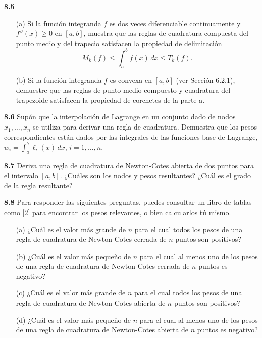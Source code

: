 \documentclass{article}
\begin{document}
\textbf{8.5}
\begin{itemize}
    \item[(a)] Si la función integranda \(f\) es dos veces diferenciable continuamente y \(f''(x) \geq 0\) en \([a, b]\), muestra que las reglas de cuadratura compuesta del punto medio y del trapecio satisfacen la propiedad de delimitación
    \[
    M_k(f) \leq \int_a^b f(x) \, dx \leq T_k(f).
    \]
    \item[(b)] Si la función integranda \(f\) es convexa en \([a, b]\) (ver Sección 6.2.1), demuestre que las reglas de punto medio compuesto y cuadratura del trapezoide satisfacen la propiedad de corchetes de la parte a.
\end{itemize}

\textbf{8.6} Supón que la interpolación de Lagrange en un conjunto dado de nodos \(x_1, \dots, x_n\) se utiliza para derivar una regla de cuadratura. Demuestra que los pesos correspondientes están dados por las integrales de las funciones base de Lagrange, \(w_i = \int_a^b \ell_i(x) \, dx\), \(i = 1, \dots, n\).

\textbf{8.7} Deriva una regla de cuadratura de Newton-Cotes abierta de dos puntos para el intervalo \([a, b]\). ¿Cuáles son los nodos y pesos resultantes? ¿Cuál es el grado de la regla resultante?

\textbf{8.8} Para responder las siguientes preguntas, puedes consultar un libro de tablas como [2] para encontrar los pesos relevantes, o bien calcularlos tú mismo.
\begin{itemize}
    \item[(a)] ¿Cuál es el valor más grande de \(n\) para el cual todos los pesos de una regla de cuadratura de Newton-Cotes cerrada de \(n\) puntos son positivos?
    \item[(b)] ¿Cuál es el valor más pequeño de \(n\) para el cual al menos uno de los pesos de una regla de cuadratura de Newton-Cotes cerrada de \(n\) puntos es negativo?
    \item[(c)] ¿Cuál es el valor más grande de \(n\) para el cual todos los pesos de una regla de cuadratura de Newton-Cotes abierta de \(n\) puntos son positivos?
    \item[(d)] ¿Cuál es el valor más pequeño de \(n\) para el cual al menos uno de los pesos de una regla de cuadratura de Newton-Cotes abierta de \(n\) puntos es negativo?
\end{itemize}
\end{document}
